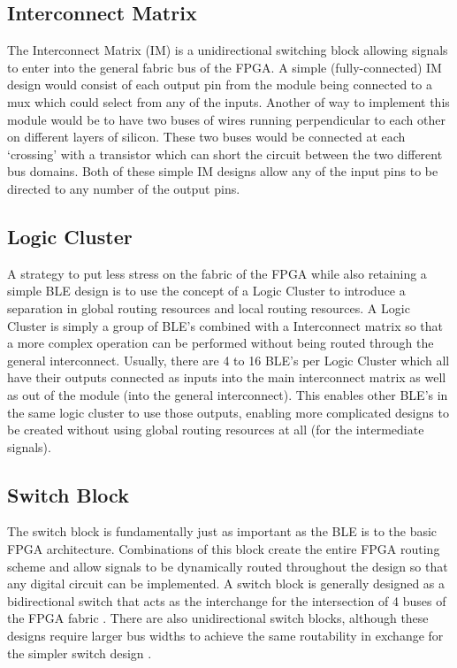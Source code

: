 \documentclass[12pt]{article}
\begin{document}
\subsection{Interconnect Matrix}
The Interconnect Matrix (IM) is a unidirectional switching block allowing signals 
to enter into the general fabric bus of the FPGA. A simple (fully-connected) IM design 
would consist of each output pin from the module being connected to a mux which could 
select from any of the inputs. Another of way to implement this module would be to 
have two buses of wires running perpendicular to each other on different layers of 
silicon. These two buses would be connected at each ‘crossing’ with a transistor 
which can short the circuit between the two different bus domains. Both of these 
simple IM designs allow any of the input pins to be directed to any number of the 
output pins.


\subsection{Logic Cluster}
A strategy to put less stress on the fabric of the FPGA while also retaining a simple 
BLE design is to use the concept of a Logic Cluster to introduce a separation in 
global routing resources and local routing resources. A Logic Cluster is simply a 
group of BLE’s combined with a Interconnect matrix so that a more complex operation 
can be performed without being routed through the general interconnect. Usually, 
there are 4 to 16 BLE’s per Logic Cluster which all have their outputs connected 
as inputs into the main interconnect matrix as well as out of the module (into the 
general interconnect). This enables other BLE’s in the same logic cluster to use 
those outputs, enabling more complicated designs to be created without using global 
routing resources at all (for the intermediate signals).

\subsection{Switch Block}
The switch block is fundamentally just as important as the BLE is to the basic FPGA 
architecture. Combinations of this block create the entire FPGA routing scheme and 
allow signals to be dynamically routed throughout the design so that any digital 
circuit can be implemented. A switch block is generally designed as a bidirectional 
switch that acts as the interchange for the intersection of 4 buses of the FPGA fabric
. There are also unidirectional switch blocks, although these designs require larger 
bus widths to achieve the same routability in exchange for the simpler switch design
.
\end{document}
